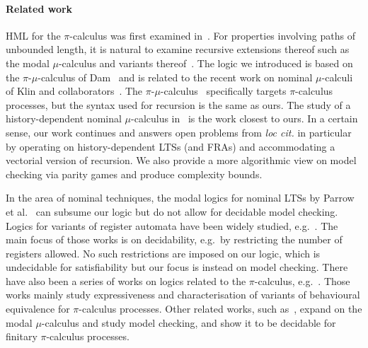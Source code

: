 \paragraph*{Related work}
HML for the $\pi$-calculus was first examined in~\cite{MilnerPW93}. For properties involving paths
of unbounded length, it is natural to examine recursive extensions thereof such as the modal $\mu$-calculus
and variants thereof~\cite{BradfieldS07}. The logic we introduced is based on the $\pi$-$\mu$-calculus of Dam~\cite{Dam03} and is related to
the recent work on nominal $\mu$-calculi of Klin and collaborators~\cite{KlinL17,KlinL19,KlinHD}.
The $\pi$-$\mu$-calculus~\cite{Dam03} specifically targets $\pi$-calculus processes, but the syntax used for recursion is the same as ours.
The study of a history-dependent nominal $\mu$-calculus in~\cite{KlinHD} is the work closest to ours. In a certain sense, our work continues and answers open problems from \emph{loc cit.}
 in particular by operating on history-dependent LTSs (and FRAs) and accommodating a vectorial version of recursion.
We also provide a more algorithmic view on model checking via parity games and produce complexity bounds. 

In the area of nominal techniques, the modal logics for nominal LTSs by Parrow et al.~\cite{NomLogics} can subsume our logic but do not allow for decidable model checking.
%
Logics for variants of register automata have been widely studied, e.g.~\cite{DBLP:conf/csl/Segoufin06,DBLP:journals/tocl/DemriL09,DBLP:conf/mfcs/FigueiraS09}.
The main focus of those works is on decidability, e.g.\ by restricting the number of registers allowed. No such restrictions are imposed on our logic, which is undecidable for satisfiability but our focus is instead on model checking.
There have also been a series of works on logics related to the $\pi$-calculus, e.g.~\cite{DBLP:journals/mscs/NicolaL08,DBLP:journals/cl/KoutavasH12,DBLP:conf/icalp/BergerHY08}.
Those works mainly study expressiveness and characterisation of variants of behavioural equivalence for $\pi$-calculus processes. 
Other related works, such as~\cite{DBLP:journals/iandc/Dam96,BradfieldStevens99}, expand on the modal $\mu$-calculus and study model checking, and show it to be decidable for finitary $\pi$-calculus processes. 

